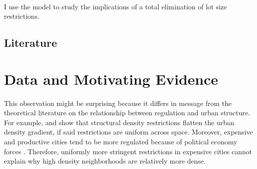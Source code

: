 \documentclass[]{article}
\begin{document}
	\paragraph*{}
	I use the model to study the implications of a total elimination of lot size restrictions.
	


	\subsection{Literature}
	
	\newpage
	\section{Data and Motivating Evidence}
	\paragraph*{}
	This observation might be surprising because it differs in message from the theoretical literature on the relationship between regulation and urban structure. For example, \cite{bbheight} and \cite{mills2005} show that structural density restrictions flatten the urban density gradient, if said restrictions are uniform across space. Moreover, expensive and productive cities tend to be more regulated because of political economy forces \citep{HILBER2013, parkho}. Therefore, uniformly more stringent restrictions in expensive cities cannot explain why high density neighborhoods are relatively more dense.
	\newpage\newpage
	\scriptsize
	
		
\end{document}
